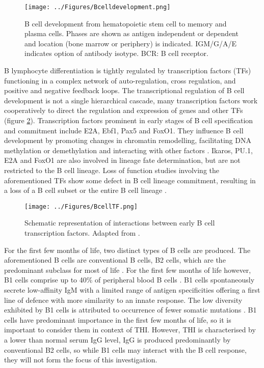 \documentclass[12pt]{article}
\begin{document}
			
			\begin{figure}[tb]
				\centering
				\texttt{[image: ../Figures/Bcelldevelopment.png]}
				\caption{B cell development from hematopoietic stem cell to memory and plasma cells. Phases are shown as antigen independent or dependent and location (bone marrow or periphery) is indicated. IGM/G/A/E indicates option of antibody isotype. BCR: B cell receptor.}
				\label{fig:BCellDevelopment}
			\end{figure}
			
			B lymphocyte differentiation is tightly regulated by transcription factors (TFs) functioning in a complex network of auto-regulation, cross regulation, and positive and negative feedback loops.
			The transcriptional regulation of B cell development is not a single hierarchical cascade, many transcription factors work cooperatively to direct the regulation and expression of genes and other TFs (figure \ref{fig:TFBcell}). 
			Transcription factors prominent in early stages of B cell specification and commitment include E2A, Ebf1, Pax5 and FoxO1. 
			They influence B cell development by promoting changes in chromatin remodelling, facilitating DNA methylation or demethylation and interacting with other factors \citep{Gao09,Maier04,Walter08,Decker09,Lin10,McManus11,Treiber10,Zandi00}. 
			Ikaros, PU.1, E2A and FoxO1 are also involved in lineage fate determination, but are not restricted to the B cell lineage.
			Loss of function studies involving the aforementioned TFs show some defect in B cell lineage commitment, resulting in a loss of a B cell subset or the entire B cell lineage \citep{Choukrallah14}.

			
			\begin{figure}
				\centering
				\texttt{[image: ../Figures/BcellTF.png]}
				\caption{Schematic representation of interactions between early B cell transcription factors. Adapted from \citet{Choukrallah14}.}
				\label{fig:TFBcell}
			\end{figure}
			
			For the first few months of life, two distinct types of B cells are produced. 
			The aforementioned B cells are conventional B cells, B2 cells, which are the predominant subclass for most of life \citep{Simon15}. 
			For the first few months of life however, B1 cells comprise up to 40\% of peripheral blood B cells \citep{Griffin11}. 
			B1 cells spontaneously secrete low-affinity IgM with a limited range of antigen specificities offering a first line of defence with more similarity to an innate response.
			The low diversity exhibited by B1 cells is attributed to occurrence of fewer somatic mutations \citep{Montecino-Rodriguez12}.
			B1 cells have predominant importance in the first few months of life, so it is important to consider them in context of THI. 
			However, THI is characterised by a lower than normal serum IgG level, IgG is produced predominantly by conventional B2 cells, so while B1 cells may interact with the B cell response, they will not form the focus of this investigation.
			
\end{document}
